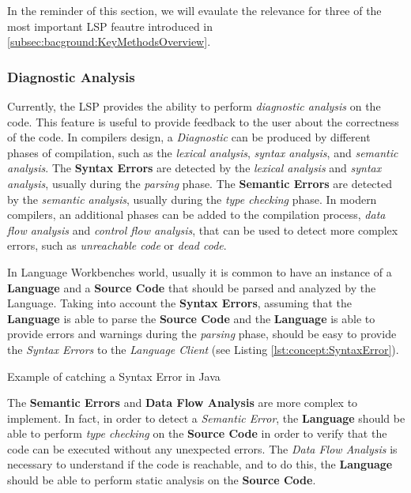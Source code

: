 In the reminder of this section, we will evaulate the relevance for three of the most important LSP feautre introduced in \ref{subsec:bacground:KeyMethodsOverview}.

\subsubsection{Diagnostic Analysis}\label{subsubsec:concept:DiagnosticAnalysis}

Currently, the LSP provides the ability to perform \textit{diagnostic analysis} on the code. This feature is useful to provide feedback to the user about the correctness of the code.
In compilers design, a \textit{Diagnostic} can be produced by different phases of compilation, such as the \textit{lexical analysis}, \textit{syntax analysis}, and \textit{semantic analysis}.
The \textbf{Syntax Errors} are detected by the \textit{lexical analysis} and \textit{syntax analysis}, usually during the \textit{parsing} phase. The \textbf{Semantic Errors} are detected by the \textit{semantic analysis}, usually during the \textit{type checking} phase.
In modern compilers, an additional phases can be added to the compilation process, \textit{data flow analysis} and \textit{control flow analysis}, that can be used to detect more complex errors, such as \textit{unreachable code} or \textit{dead code}.

In Language Workbenches world, usually it is common to have an instance of a \textbf{Language} and a \textbf{Source Code} that should be parsed and analyzed by the Language.
Taking into account the \textbf{Syntax Errors}, assuming that the \textbf{Language} is able to parse the \textbf{Source Code} and the \textbf{Language} is able to provide errors and warnings during the \textit{parsing} phase, should be easy to provide the \textit{Syntax Errors} to the \textit{Language Client} (see Listing \ref{lst:concept:SyntaxError}).

\begin{Listing}[t]
    \centering
    \caption{Example of catching a Syntax Error in Java}
    \label{lst:concept:SyntaxError}
\end{Listing}

The \textbf{Semantic Errors} and \textbf{Data Flow Analysis} are more complex to implement. In fact, in order to detect a \textit{Semantic Error}, the \textbf{Language} should be able to perform \textit{type checking} on the \textbf{Source Code} in order to verify that the code can be executed without any unexpected errors. The \textit{Data Flow Analysis} is necessary to understand if the code is reachable, and to do this, the \textbf{Language} should be able to perform static analysis on the \textbf{Source Code}.

